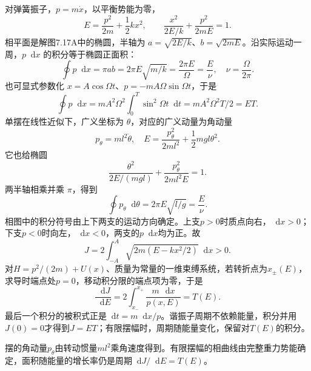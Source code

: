 \documentclass[UTF8,fontset=fandol,a4paper,11pt]{ctexart}
\newcommand{\dd}{\mathop{}\!\mathrm{d}}
\newcommand{\figcaption}[1]{\par\vspace{2pt}{\small\color{muted}#1}\par}
\begin{document}
\begin{center}\begin{minipage}{\linewidth}\centering{}\figcaption{解图 7.17A}\end{minipage}\end{center}
对弹簧振子，$p=m\dot x$，以平衡势能为零，
\[E=\frac{p^2}{2m}+\frac12kx^2,
\qquad\frac{x^2}{2E/k}+\frac{p^2}{2mE}=1.\]
相平面是解图7.17A中的椭圆，半轴为 $a=\sqrt{2E/k}$、$b=\sqrt{2mE}$。沿实际运动一周，$p\dd x$ 的积分等于椭圆正面积：
\[\oint p\dd x=\pi ab=2\pi E\sqrt{m/k}
=\frac{2\pi E}{\Omega}=\frac E\nu,\quad\nu=\frac\Omega{2\pi}.\]
也可显式参数化 $x=A\cos\Omega t$、$p=-mA\Omega\sin\Omega t$，于是
\[\oint p\dd x=mA^2\Omega^2\int_0^T\sin^2\Omega t\dd t
=mA^2\Omega^2T/2=ET.\]
单摆在线性近似下，广义坐标为 $\theta$，对应的广义动量为角动量
\[p_\theta=ml^2\dot\theta,\quad
E=\frac{p_\theta^2}{2ml^2}+\frac12mgl\theta^2.\]
它也给椭圆
\[\frac{\theta^2}{2E/(mgl)}+\frac{p_\theta^2}{2ml^2E}=1.\]
两半轴相乘并乘 $\pi$，得到
\[\boxed{\oint p_\theta\dd\theta=2\pi E\sqrt{l/g}=\frac E\nu.}\]
相图中的积分符号由上下两支的运动方向确定。上支$p>0$时质点向右，$\dd x>0$；下支$p<0$时向左，$\dd x<0$，两支的$p\dd x$均为正。故
\[J=2\int_{-A}^{A}\sqrt{2m(E-kx^2/2)}\dd x>0.\]
对$H=p^2/(2m)+U(x)$、质量为常量的一维束缚系统，若转折点为$x_\pm(E)$，求导时端点处$p=0$，移动积分限的端点项为零，于是
\[\frac{\dd J}{\dd E}=2\int_{x_-}^{x_+}\frac{m\,\dd x}{p(x,E)}=T(E).\]
最后一个积分的被积式正是$\dd t= m\dd x/p$。谐振子周期不依赖能量，积分并用$J(0)=0$才得到$J=ET$；有限摆幅时，周期随能量变化，保留对$T(E)$的积分。

摆的角动量$p_\theta$由转动惯量$ml^2$乘角速度得到。有限摆幅的相曲线由完整重力势能确定，面积随能量的增长率仍是周期$\dd J/\dd E=T(E)$。
\end{document}
